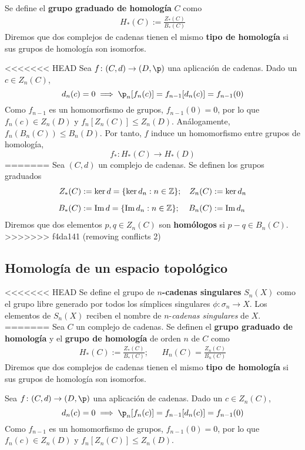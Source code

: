 \begin{proposition}
\begin{definition}
	Se define el \textbf{grupo graduado de homología} $C$ como 
		\begin{align*}
			H_*(C):=\frac{Z_*(C)}{B_*(C)}
		\end{align*}
	Diremos que dos complejos de cadenas tienen el mismo \textbf{tipo de homología} si sus grupos de homología son isomorfos.
\end{definition}

<<<<<<< HEAD
Sea $f\colon (C,d) \to (D,\p)$ una aplicación de cadenas.
Dado un $c \in Z_n(C)$,
	\[d_n(c)=0 \implies \p_n[f_n(c)]=f_{n-1}[d_n(c)]=f_{n-1}(0)\]
Como $f_{n-1}$ es un homomorfismo de grupos, $f_{n-1}(0)=0$, por lo que $f_n(c)\in Z_n(D)$ y $f_n[Z_n(C)]\leq Z_n(D)$.
Análogamente, $f_n(B_n(C)) \leq B_n(D)$.
Por tanto, $f$ induce un homomorfismo entre grupos de homología,
	\[f_*\colon H_*(C) \to H_*(D)\]
=======
Sea $(C,d)$ un complejo de cadenas. Se definen los grupos graduados
\begin{align*}
Z_*(C)&:=\ker d=\{\ker d_n: n \in \mathbb{Z}\};	& Z_n(C)&:=\ker d_n\\[0.2cm]
B_*(C)&:=\operatorname{Im} d=\{\operatorname{Im} d_n: n \in \mathbb{Z}\}; 	& B_n(C)&:=\operatorname{Im} d_n
\end{align*}
Diremos que dos elementos $p,q \in Z_n(C)$ son \textbf{homólogos} si
$p-q \in B_n(C)$.
>>>>>>> f4da141 (removing conflicts 2)

\subsection{Homología de un espacio topológico}
\begin{definition}
<<<<<<< HEAD
	Se define el grupo de \textbf{$n$-cadenas singulares} $S_n(X)$ como el grupo libre generado por todos los símplices singulares $\phi\colon \sigma_n \to X$.
	Los elementos de $S_n(X)$ reciben el nombre de $n$-\emph{cadenas singulares} de $X$.
=======
Sea $C$ un complejo de cadenas. Se definen el \textbf{grupo graduado de
homología} y el \textbf{grupo de homología} de orden $n$ de $C$ como 
\begin{align*}
H_*(C):=\frac{Z_*(C)}{B_*(C)}; && H_n(C)=\frac{Z_n(C)}{B_n(C)}
\end{align*}
Diremos que dos complejos de cadenas tienen el mismo \textbf{tipo de homología}
si sus grupos de homología son isomorfos.
\end{definition}

Sea $f\colon (C,d) \to (D,\p)$ una aplicación de cadenas. Dado un
$c \in Z_n(C)$,
\[d_n(c)=0 \implies \p_n[f_n(c)]=f_{n-1}[d_n(c)]=f_{n-1}(0)\]
Como $f_{n-1}$ es un homomorfismo de grupos, $f_{n-1}(0)=0$, por lo que
$f_n(c)\in Z_n(D)$ y $f_n[Z_n(C)]\leq Z_n(D)$.


\end{proposition}
